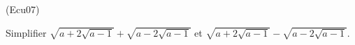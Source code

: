 \begin{tiny}(Ecu07)\end{tiny}
Simplifier $\sqrt{a+2\sqrt{a-1}}+\sqrt{a-2\sqrt{a-1}}$ et $\sqrt{a+2\sqrt{a-1}}-\sqrt{a-2\sqrt{a-1}}$.
